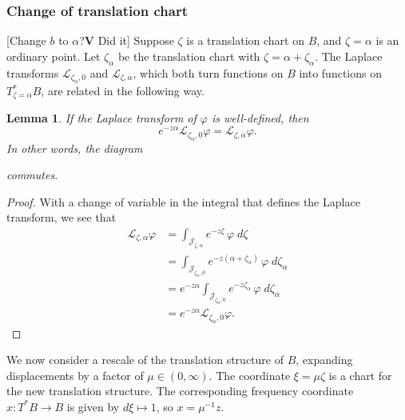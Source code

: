 \documentclass{article}
\newcommand{\singexp}[2]{\mathcal{H}L^\infty_{#1, #2}}
\newcommand{\maps}{\colon}
\newcommand{\laplace}{\mathcal{L}}
\theoremstyle{definition}
\theoremstyle{plain}
\newtheorem{lemma}[definition]{Lemma}
\newenvironment{todo}{\color{Coral}}{\color{black}}
\begin{document}
\subsubsection{Change of translation chart}\label{sec:change-translation}
\begin{todo}[Change $b$ to $\alpha$?\textbf{V} Did it]\end{todo} Suppose $\zeta$ is a translation chart on $B$, and $\zeta = \alpha$ is an ordinary point. Let $\zeta_\alpha$ be the translation chart with $\zeta = \alpha + \zeta_\alpha$. The Laplace transforms $\laplace_{\zeta_\alpha, 0}$ and $\laplace_{\zeta, \alpha}$, which both turn functions on $B$ into functions on $T^*_{\zeta = \alpha}B$, are related in the following way.
\begin{lemma}\label{translation}
If the Laplace transform of $\varphi$ is well-defined, then
   \begin{equation}
    \label{change-chart}
    e^{-z\alpha} \laplace_{\zeta_\alpha, 0} \varphi = \laplace_{\zeta, \alpha} \varphi.
\end{equation}
\begin{todo}
In other words, the diagram
\begin{center}
\end{center}
commutes.
\end{todo}
\end{lemma}
\begin{proof}
With a change of variable in the integral that defines the Laplace transform, we see that
\begin{align*}
\laplace_{\zeta, \alpha} \varphi & = \int_{\mathcal{J}_{\zeta,\alpha}} e^{-z \zeta}\,\varphi\;d\zeta \\
& = \int_{\mathcal{J}_{\zeta_\alpha,0}} e^{-z(\alpha + \zeta_\alpha)}\,\varphi\;d\zeta_\alpha \\
& = e^{-z\alpha } \int_{\mathcal{J}_{\zeta_\alpha,0}} e^{-z\zeta_\alpha}\,\varphi\;d\zeta_\alpha \\
& = e^{-z\alpha } \laplace_{\zeta_\alpha, 0} \varphi.
\end{align*}
\end{proof}
We now consider a rescale of the translation structure of $B$, expanding displacements by a factor of $\mu \in (0, \infty)$. The coordinate $\xi = \mu\zeta$ is a chart for the new translation structure. The corresponding frequency coordinate $x \maps T^*B \to B$ is given by $d\xi \mapsto 1$, so $x = \mu^{-1} z$. 
\end{document}
